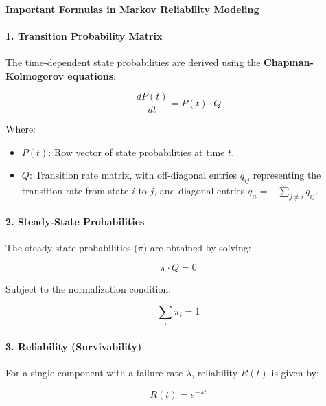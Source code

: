 \documentclass[a4paper,12pt]{article}
\begin{document}
\begin{answerbox}
		\paragraph{Important Formulas in Markov Reliability Modeling}
		
		\paragraph{1. Transition Probability Matrix}
		The time-dependent state probabilities are derived using the \textbf{Chapman-Kolmogorov equations}:
		
		\[
		\frac{dP(t)}{dt} = P(t) \cdot Q
		\]
		
		Where:
		\begin{itemize}
			\item \( P(t) \): Row vector of state probabilities at time \( t \).
			\item \( Q \): Transition rate matrix, with off-diagonal entries \( q_{ij} \) representing the transition rate from state \( i \) to \( j \), and diagonal entries \( q_{ii} = -\sum_{j \neq i} q_{ij} \).
		\end{itemize}
		
		\paragraph{2. Steady-State Probabilities}
		The steady-state probabilities (\( \pi \)) are obtained by solving:
		
		\[
		\pi \cdot Q = 0
		\]
		
		Subject to the normalization condition:
		
		\[
		\sum_i \pi_i = 1
		\]
		
		\paragraph{3. Reliability (Survivability)}
		For a single component with a failure rate \( \lambda \), reliability \( R(t) \) is given by:
		
		\[
		R(t) = e^{-\lambda t}
		\]
	\end{answerbox}
	
\end{document}
